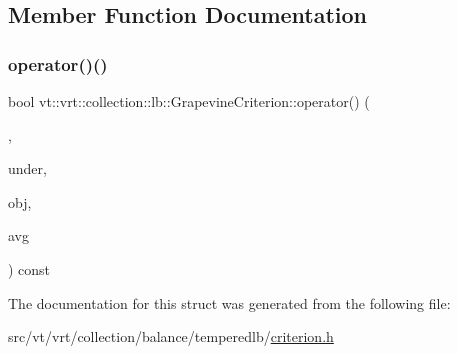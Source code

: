\subsection{Member Function Documentation}
\mbox{\label{structvt_1_1vrt_1_1collection_1_1lb_1_1_grapevine_criterion_a2eb0e24abfcf4bea47588b77a0a6b1f0}} 
\subsubsection{\texorpdfstring{operator()()}{operator()()}}
{\footnotesize\ttfamily bool vt\+::vrt\+::collection\+::lb\+::\+Grapevine\+Criterion\+::operator() (\begin{DoxyParamCaption}\item[{\hyperlink{structvt_1_1vrt_1_1collection_1_1lb_1_1_criterion_base_a78e6b14fc6f7b34acac1d7cd4e850180}{Load\+Type}}]{,  }\item[{\hyperlink{structvt_1_1vrt_1_1collection_1_1lb_1_1_criterion_base_a78e6b14fc6f7b34acac1d7cd4e850180}{Load\+Type}}]{under,  }\item[{\hyperlink{structvt_1_1vrt_1_1collection_1_1lb_1_1_criterion_base_a78e6b14fc6f7b34acac1d7cd4e850180}{Load\+Type}}]{obj,  }\item[{\hyperlink{structvt_1_1vrt_1_1collection_1_1lb_1_1_criterion_base_a78e6b14fc6f7b34acac1d7cd4e850180}{Load\+Type}}]{avg }\end{DoxyParamCaption}) const\hspace{0.3cm}{\ttfamily [inline]}}



The documentation for this struct was generated from the following file\+:\begin{DoxyCompactItemize}
\item 
src/vt/vrt/collection/balance/temperedlb/\hyperlink{criterion_8h}{criterion.\+h}\end{DoxyCompactItemize}
